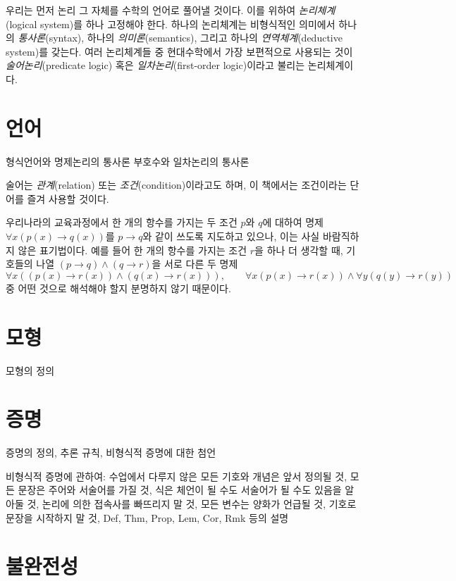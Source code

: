 \documentclass{../../large}
\begin{document}
우리는 먼저 논리 그 자체를 수학의 언어로 풀어낼 것이다.
이를 위하여 \emph{논리체계}(logical system)를 하나 고정해야 한다.
하나의 논리체계는 비형식적인 의미에서 하나의 \emph{통사론}(syntax), 하나의 \emph{의미론}(semantics), 그리고 하나의 \emph{연역체계}(deductive system)를 갖는다.
여러 논리체계들 중 현대수학에서 가장 보편적으로 사용되는 것이 \emph{술어논리}(predicate logic) 혹은 \emph{일차논리}(first-order logic)이라고 불리는 논리체계이다.




\section{언어}



형식언어와 명제논리의 통사론
부호수와 일차논리의 통사론


술어는 \emph{관계}(relation) 또는 \emph{조건}(condition)이라고도 하며, 이 책에서는 조건이라는 단어를 즐겨 사용할 것이다.


우리나라의 교육과정에서 한 개의 항수를 가지는 두 조건 $p$와 $q$에 대하여 명제 $\forall x(p(x)\to q(x))$를 $p\to q$와 같이 쓰도록 지도하고 있으나, 이는 사실 바람직하지 않은 표기법이다.
예를 들어 한 개의 항수를 가지는 조건 $r$을 하나 더 생각할 때, 기호들의 나열 $(p\to q)\wedge(q\to r)$을 서로 다른 두 명제
\[\forall x((p(x)\to r(x))\wedge(q(x)\to r(x))),\qquad\forall x(p(x)\to r(x))\wedge\forall y(q(y)\to r(y))\]
중 어떤 것으로 해석해야 할지 분명하지 않기 때문이다.


\section{모형}
모형의 정의
\section{증명}
증명의 정의, 추론 규칙, 비형식적 증명에 대한 첨언


비형식적 증명에 관하여:
수업에서 다루지 않은 모든 기호와 개념은 앞서 정의될 것,
모든 문장은 주어와 서술어를 가질 것,
식은 체언이 될 수도 서술어가 될 수도 있음을 알아둘 것,
논리에 의한 접속사를 빠뜨리지 말 것,
모든 변수는 양화가 언급될 것,
기호로 문장을 시작하지 말 것,
Def, Thm, Prop, Lem, Cor, Rmk 등의 설명

\section{불완전성}
\end{document}
